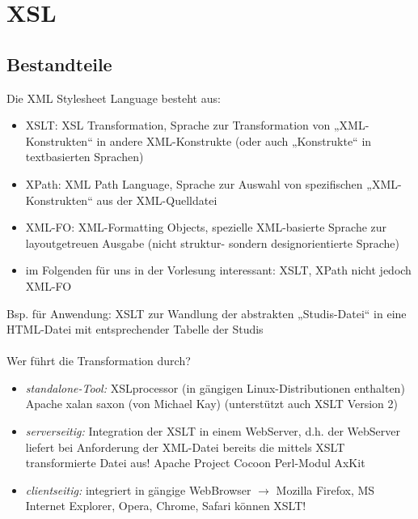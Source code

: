 \chapter{XSL}

\section{Bestandteile}
Die XML Stylesheet Language besteht aus:
\begin{itemize}
\item XSLT: XSL Transformation, Sprache zur Transformation von „XML-Konstrukten“ in andere XML-Konstrukte (oder auch „Konstrukte“ in textbasierten Sprachen)
\item XPath: XML Path Language, Sprache zur Auswahl von spezifischen „XML-Konstrukten“ aus der XML-Quelldatei
\item XML-FO: XML-Formatting Objects, spezielle XML-basierte Sprache zur layoutgetreuen Ausgabe (nicht struktur- sondern designorientierte Sprache)
\item im Folgenden für uns in der Vorlesung interessant: XSLT, XPath nicht jedoch XML-FO
\end{itemize}
\vspace*{0,3cm}

Bsp. für Anwendung: XSLT zur Wandlung der abstrakten „Studis-Datei“ in eine HTML-Datei mit entsprechender Tabelle der Studis\\
\\
Wer führt die Transformation durch?
\begin{itemize}
\item \emph{standalone-Tool:} XSLprocessor (in gängigen Linux-Distributionen enthalten) Apache xalan saxon (von Michael Kay) (unterstützt auch XSLT Version 2)
\item \emph{serverseitig:} Integration der XSLT in einem WebServer, d.h. der WebServer liefert			bei Anforderung der XML-Datei bereits die mittels XSLT transformierte Datei aus!
Apache Project Cocoon
Perl-Modul AxKit
\item \emph{clientseitig:} integriert in gängige WebBrowser $\rightarrow$ Mozilla Firefox, MS Internet Explorer, Opera, Chrome, Safari können XSLT!
\end{itemize}